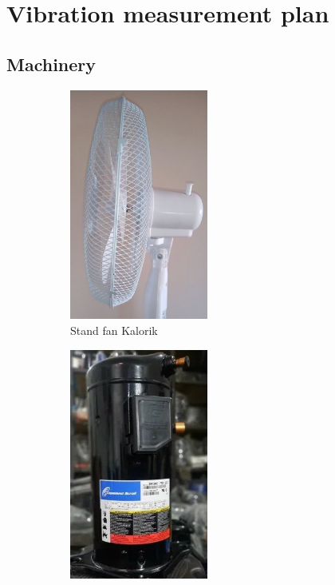 \section{Vibration measurement plan}

\subsection{Machinery}

\begin{figure}[ht]
    \centering
    \begin{subfigure}[b]{0.49\textwidth}
    		\centering
        \includegraphics[width=0.5\textwidth]{assets/design/machine-fan.jpg}
        \caption{Stand fan Kalorik}
    \end{subfigure}
    \hfill
    \begin{subfigure}[b]{0.49\textwidth}
    		\centering
        \includegraphics[width=0.5\textwidth]{assets/design/machine-compressor.jpg}

\end{subfigure}
\end{figure}
